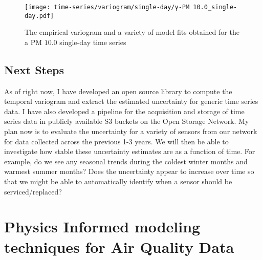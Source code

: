 \begin{figure}[h]
  \centering
  \texttt{[image: time-series/variogram/single-day/γ-PM 10.0\_single-day.pdf]}
  \caption{The empirical variogram and a variety of model fits obtained for the a PM $10.0$ single-day time series}
  \label{fig:pm10-variogram-fits}
\end{figure}

\subsection{Next Steps}

As of right now, I have developed an open source library to compute the temporal variogram and extract the estimated uncertainty for generic time series data. I have also developed a pipeline for the acquisition and storage of time series data in publicly available S3 buckets on the Open Storage Network. My plan now is to evaluate the uncertainty for a variety of sensors from our network for data collected across the previous 1-3 years. We will then be able to investigate how stable these uncertainty estimates are as a function of time. For example, do we see any seasonal trends during the coldest winter months and warmest summer months? Does the uncertainty appear to increase over time so that we might be able to automatically identify when a sensor should be serviced/replaced? 



\section{Physics Informed modeling techniques for Air Quality Data}


